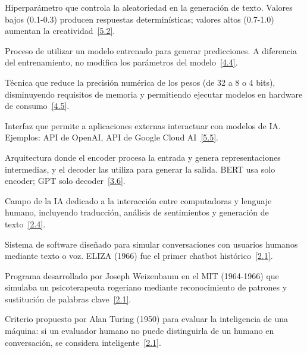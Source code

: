 \documentclass[12pt,a4paper]{report}
\numberwithin{figure}{section}
\begin{document}
\begin{description}[style=nextline, leftmargin=1.5cm, labelwidth=1.3cm]
\item[\textbf{Temperatura:}] \label{glos:temperatura} Hiperparámetro que controla la aleatoriedad en la generación de texto. Valores bajos (0.1-0.3) producen respuestas determinísticas; valores altos (0.7-1.0) aumentan la creatividad~\hyperref[ref:5]{[5.2]}.

\item[\textbf{Inferencia:}] \label{glos:inferencia} Proceso de utilizar un modelo entrenado para generar predicciones. A diferencia del entrenamiento, no modifica los parámetros del modelo~\hyperref[ref:4]{[4.4]}.

\item[\textbf{Cuantización:}] \label{glos:cuantizacion} Técnica que reduce la precisión numérica de los pesos (de 32 a 8 o 4 bits), disminuyendo requisitos de memoria y permitiendo ejecutar modelos en hardware de consumo~\hyperref[ref:4]{[4.5]}.

\item[\textbf{API (\textit{Application Programming Interface}):}] \label{glos:api} Interfaz que permite a aplicaciones externas interactuar con modelos de IA. Ejemplos: API de OpenAI, API de Google Cloud AI~\hyperref[ref:5]{[5.5]}.

\item[\textbf{Encoder-Decoder:}] \label{glos:encdec} Arquitectura donde el encoder procesa la entrada y genera representaciones intermedias, y el decoder las utiliza para generar la salida. BERT usa solo encoder; GPT solo decoder~\hyperref[ref:3]{[3.6]}.

\item[\textbf{Procesamiento de Lenguaje Natural (PLN):}] \label{glos:pln} Campo de la IA dedicado a la interacción entre computadoras y lenguaje humano, incluyendo traducción, análisis de sentimientos y generación de texto~\hyperref[ref:2]{[2.4]}.

\item[\textbf{Chatbot:}] \label{glos:chatbot} Sistema de software diseñado para simular conversaciones con usuarios humanos mediante texto o voz. ELIZA (1966) fue el primer chatbot histórico~\hyperref[ref:2]{[2.1]}.

\item[\textbf{ELIZA:}] \label{glos:eliza} Programa desarrollado por Joseph Weizenbaum en el MIT (1964-1966) que simulaba un psicoterapeuta rogeriano mediante reconocimiento de patrones y sustitución de palabras clave~\hyperref[ref:2]{[2.1]}.

\item[\textbf{Test de Turing:}] \label{glos:turing} Criterio propuesto por Alan Turing (1950) para evaluar la inteligencia de una máquina: si un evaluador humano no puede distinguirla de un humano en conversación, se considera inteligente~\hyperref[ref:2]{[2.1]}.


\end{description}
\end{document}
